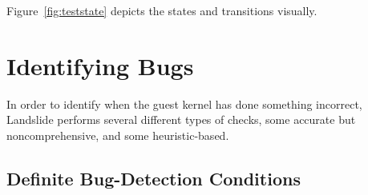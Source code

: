 Figure~\ref{fig:teststate} depicts the states and transitions visually.


\section{Identifying Bugs}
\label{sec:techniques-bugs}

In order to identify when the guest kernel has done something incorrect, Landslide performs several different types of checks, some accurate but noncomprehensive, and some heuristic-based.

\subsection{Definite Bug-Detection Conditions}

